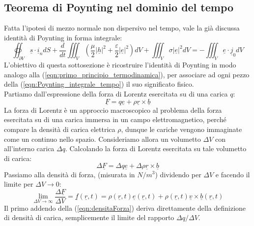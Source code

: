 \documentclass{book}
\begin{document}
    \subsection{Teorema di Poynting nel dominio del tempo}
        Fatta l'ipotesi di mezzo normale non dispersivo nel tempo, vale la già discussa identità di Poynting in forma integrale:
        \begin{equation}
            \label{eqn:Poynting_integrale_tempo}
            \oiint_{\partial V} \underline{s} \cdot \underline{i}_{n}dS+\frac{d}{dt}\iiint_{V}(\frac{\mu}{2}|\underline{h}|^{2}+\frac{\varepsilon}{2}|\underline{e}|^{2})dV +
            \iiint_{V}\sigma |\underline{e}|^{2}dV = - \iiint_{V} \underline{e}\cdot \underline{j}_{0}dV
        \end{equation}
        L'obiettivo di questa sottosezione è ricostruire l'identità di Poynting in modo analogo alla (\ref{eqn:primo_principio_termodinamica}), per associare ad ogni pezzo della
        (\ref{eqn:Poynting_integrale_tempo}) il suo significato fisico. \\
        Partiamo dall'espressione della forza di Lorentz esercitata su di una carica $q$:
        \begin{equation}
            \underline{F}= q \underline{e}+\rho \underline{r} \times \underline{b}
        \end{equation}
        La forza di Lorentz è un approccio macroscopico al problema della forza esercitata su di una carica immersa in un campo elettromagnetico, perché compare la densità di carica
        elettrica $\rho$, dunque le cariche vengono immaginate come un continuo nello spazio. Consideriamo allora un volumetto $\Delta V$ con all'interno carica $\Delta q$.
        Calcolando la forza di Lorentz esercitata su tale volumetto di carica:
        \begin{equation}
            \Delta \underline{F} = \Delta q\underline{e}+\Delta \rho \underline{r}\times \underline{b}
        \end{equation}
        Passiamo alla densità di forza, (misurata in $N/m^{3}$) dividendo per $\Delta V$ e facendo il limite per $\Delta V \to 0$:
        \begin{equation}
            \label{eqn:densitaForza}
            \lim_{\Delta V \to \infty} \frac{\Delta \underline{F}}{\Delta V} = \underline{f}(\underline{r},t) = \rho(\underline{r},t)\underline{e}(\underline{r},t)+\rho(\underline{r},t)\underline{v}\times \underline{b}(\underline{r},t)
        \end{equation}
        Il primo addendo della (\ref{eqn:densitaForza}) deriva direttamente della definizione di densità di carica, semplicemente il limite del rapporto $\Delta q/\Delta V$.
\end{document}
